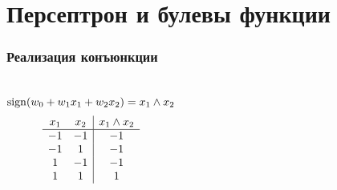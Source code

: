 \documentclass[24pt,pdf,hyperref={unicode},aspectratio=169]{beamer}
\begin{document}
\section{Персептрон и булевы функции}

\begin{frame}\frametitle{Реализация конъюнкции}
\uncover<+->{}
\begin{columns}
$$
{\rm sign}(w_0+w_1x_1+w_2x_2)=x_1\wedge x_2
$$
$$
\begin{array}{c c | c}
x_1 & x_2 & x_1\wedge x_2 \\
\hline
-1 & -1 & -1 \\
-1 & 1 & -1 \\
1 & -1 & -1 \\
1 & 1 & 1 \\
\end{array}
$$

\end{columns}
\end{frame}
\end{document}

